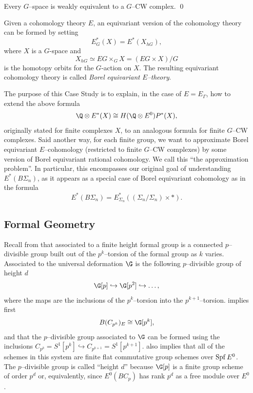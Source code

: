 \begin{theorem} \label{app:CWapprox}
Every \(G\)--space is weakly equivalent to a \(G\)--CW complex.
\qed
\end{theorem}

Given a cohomology theory \(E\), an equivariant version of the cohomology theory can be formed by setting
\[
E^{*}_{G}(X) = E^*(X_{hG}),
\]
where \(X\) is a \(G\)-space and
\[
X_{hG} \simeq EG \times_G X = (EG \times X)/G
\]
is the homotopy orbits for the \(G\)-action on \(X\).
The resulting equivariant cohomology theory is called \textit{Borel equivariant \(E\)--theory}.

The purpose of this Case Study is to explain, in the case of \(E = E_{\Gamma}\), how to extend the above formula \[\Q \otimes E^*(X) \cong H(\Q \otimes E^0)P^*(X),\] originally stated for finite complexes \(X\), to an analogous formula for finite \(G\)--CW complexes.
Said another way, for each finite group, we want to approximate Borel equivariant \(E\)--cohomology (restricted to finite \(G\)--CW complexes) by some version of Borel equivariant rational cohomology.
We call this ``the approximation problem''.
In particular, this encompasses our original goal of understanding \(E^*(B\Sigma_n)\), as it appears as a special case of Borel equivariant cohomology as in the formula \[E^*(B\Sigma_n) = E_{\Sigma_n}^*((\Sigma_n / \Sigma_n) \times *).\]

\subsection*{Formal Geometry}


Recall from  that associated to a finite height formal group is a connected \(p\)--divisible group built out of the \(p^k\)--torsion of the formal group as \(k\) varies.
Associated to the universal deformation \(\G\) is the following \(p\)--divisible group of height \(d\)
\[
\G[p] \hookrightarrow \G[p^2] \hookrightarrow \ldots,
\]
where the maps are the inclusions of the \(p^k\)--torsion into the \(p^{k+1}\)--torsion.
 implies first 
\[
B(C_{p^k})_{E} \cong \G[p^k],
\]
and that the \(p\)--divisible group associated to \(\G\) can be formed using the inclusions \(C_{p^k} = S^1[p^k] \hookrightarrow C_{p^{k+1}} = S^1[p^{k+1}]\).
 also implies that all of the schemes in this system are finite flat commutative group schemes over \(\operatorname{Spf} E^0\).
The \(p\)--divisible group is called ``height \(d\)'' because \(\G[p]\) is a finite group scheme of order \(p^d\) or, equivalently, since \(E^0(BC_p)\) has rank \(p^d\) as a free module over \(E^0\).

